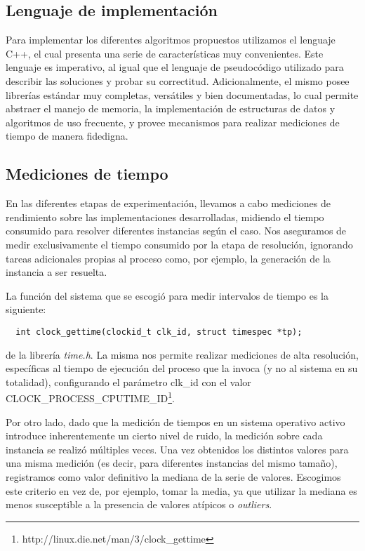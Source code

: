 \subsection{Lenguaje de implementación}

Para implementar los diferentes algoritmos propuestos utilizamos el lenguaje C++, el cual presenta una serie de características muy convenientes. Este lenguaje es imperativo, al igual que el lenguaje de pseudocódigo utilizado para describir las soluciones y probar su correctitud. Adicionalmente, el mismo posee librerías estándar muy completas, versátiles y bien documentadas, lo cual permite abstraer el manejo de memoria, la implementación de estructuras de datos y algoritmos de uso frecuente, y provee mecanismos para realizar mediciones de tiempo de manera fidedigna.

\subsection{Mediciones de tiempo}
\label{subsec:mediciones-de-tiempo}

En las diferentes etapas de experimentación, llevamos a cabo mediciones de rendimiento sobre las implementaciones desarrolladas, midiendo el tiempo consumido para resolver diferentes instancias según el caso. Nos aseguramos de medir exclusivamente el tiempo consumido por la etapa de resolución, ignorando tareas adicionales propias al proceso como, por ejemplo, la generación de la instancia a ser resuelta.

La función del sistema que se escogió para medir intervalos de tiempo es la siguiente:

\begin{verbatim}
  int clock_gettime(clockid_t clk_id, struct timespec *tp);
\end{verbatim}

de la librería \emph{time.h}. La misma nos permite realizar mediciones de alta resolución, específicas al tiempo de ejecución del proceso que la invoca (y no al sistema en su totalidad), configurando el parámetro clk\_id con el valor CLOCK\_PROCESS\_CPUTIME\_ID\footnote{http://linux.die.net/man/3/clock\_gettime}.

Por otro lado, dado que la medición de tiempos en un sistema operativo activo introduce inherentemente un cierto nivel de ruido, la medición sobre cada instancia se realizó múltiples veces. Una vez obtenidos los distintos valores para una misma medición (es decir, para diferentes instancias del mismo tamaño), registramos como valor definitivo la mediana de la serie de valores. Escogimos este criterio en vez de, por ejemplo, tomar la media, ya que utilizar la mediana es menos susceptible a la presencia de valores atípicos o \emph{outliers}.

